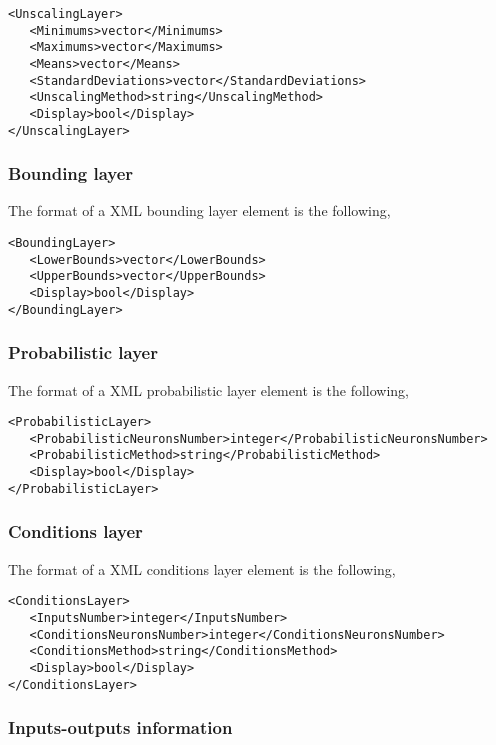 \begin{lstlisting}
<UnscalingLayer>
   <Minimums>vector</Minimums>
   <Maximums>vector</Maximums>
   <Means>vector</Means>
   <StandardDeviations>vector</StandardDeviations>
   <UnscalingMethod>string</UnscalingMethod>
   <Display>bool</Display>
</UnscalingLayer>
\end{lstlisting}

\subsubsection*{Bounding layer}

The format of a XML bounding layer element is the following,

\begin{lstlisting}
<BoundingLayer>
   <LowerBounds>vector</LowerBounds>
   <UpperBounds>vector</UpperBounds>
   <Display>bool</Display>
</BoundingLayer>
\end{lstlisting}


\subsubsection*{Probabilistic layer}

The format of a XML probabilistic layer element is the following,

\begin{lstlisting}
<ProbabilisticLayer>
   <ProbabilisticNeuronsNumber>integer</ProbabilisticNeuronsNumber>
   <ProbabilisticMethod>string</ProbabilisticMethod>
   <Display>bool</Display>
</ProbabilisticLayer>
\end{lstlisting}


\subsubsection*{Conditions layer}

The format of a XML conditions layer element is the following,

\begin{lstlisting}
<ConditionsLayer>
   <InputsNumber>integer</InputsNumber>
   <ConditionsNeuronsNumber>integer</ConditionsNeuronsNumber>
   <ConditionsMethod>string</ConditionsMethod>
   <Display>bool</Display>
</ConditionsLayer>
\end{lstlisting}

\subsubsection*{Inputs-outputs information}


